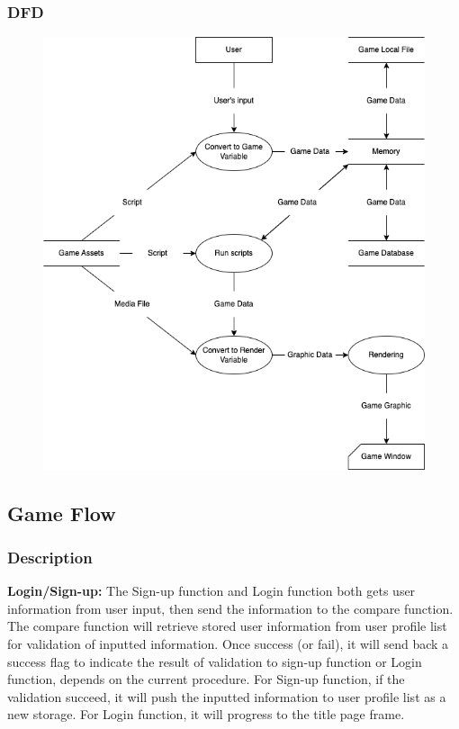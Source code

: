 \documentclass{article}
\begin{document}
\subsubsection{DFD}
\begin{figure}[H]
    \centering
    \includegraphics*[scale=0.4]{Master_DFD.png}
\end{figure}
\subsection{Game Flow}
\subsubsection{Description}
\textbf{Login/Sign-up:} The Sign-up function and Login function both gets user information from user input, then send the information to the compare function. The compare function will retrieve stored user information from user profile list for validation of inputted information. Once success (or fail), it will send back a success flag to indicate the result of validation to sign-up function or Login function, depends on the current procedure. For Sign-up function, if the validation succeed, it will push the inputted information to user profile list as a new storage. For Login function, it will progress to the title page frame.
\end{document}
